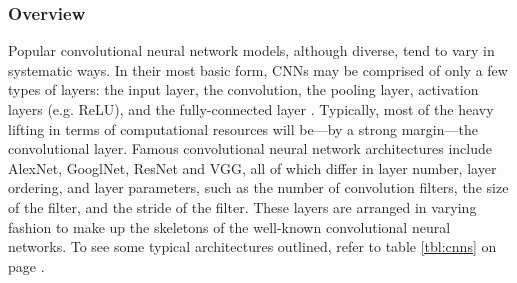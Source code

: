 \subsubsection{Overview}
Popular convolutional neural network models, although diverse, tend to vary in systematic ways. In their most basic form, CNNs may be comprised of only a few types of layers: the input layer, the convolution, the pooling layer, activation layers (e.g. ReLU), and the fully-connected layer \cite{convnets}. Typically, most of the heavy lifting in terms of computational resources will be---by a strong margin---the convolutional layer. Famous convolutional neural network architectures include AlexNet, GooglNet, ResNet and VGG, all of which differ in layer number, layer ordering, and layer parameters, such as the number of convolution filters, the size of the filter, and the stride of the filter. These layers are arranged in varying fashion to make up the skeletons of the well-known convolutional neural networks. To see some typical architectures outlined, refer to table \ref{tbl:cnns} on page \pageref{tbl:cnns}.

